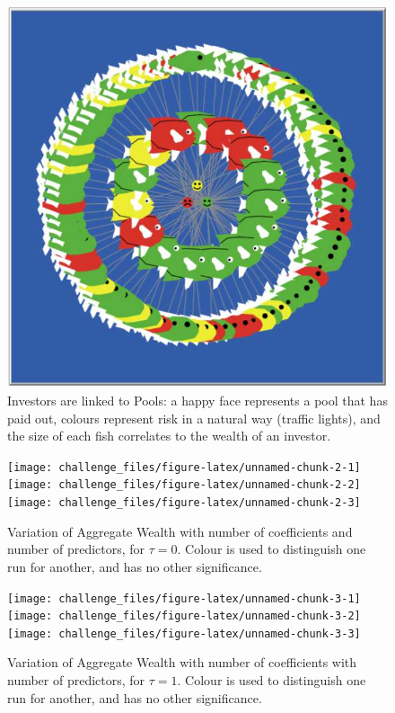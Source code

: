 \documentclass[]{article}
\begin{document}
\begin{figure}[p]

{\centering \includegraphics[width=.9\linewidth]{view} 

}

\caption{Investors are linked to Pools: a happy face represents a pool that has paid out, colours represent risk in a natural way (traffic lights), and the size of each fish correlates to the wealth of an investor.\label{fig:ui}}\label{fig:unnamed-chunk-1}
\end{figure}

\begin{figure}[p]

{\centering \texttt{[image: challenge\_files/figure-latex/unnamed-chunk-2-1]} \texttt{[image: challenge\_files/figure-latex/unnamed-chunk-2-2]} \texttt{[image: challenge\_files/figure-latex/unnamed-chunk-2-3]} 

}

\caption{\label{fig:plot_wealth0}Variation of Aggregate Wealth with number of coefficients and number of predictors, for $\tau=0$. Colour is used to distinguish one run for another, and has no other significance.}\label{fig:unnamed-chunk-2}
\end{figure}

\begin{figure}[p]

{\centering \texttt{[image: challenge\_files/figure-latex/unnamed-chunk-3-1]} \texttt{[image: challenge\_files/figure-latex/unnamed-chunk-3-2]} \texttt{[image: challenge\_files/figure-latex/unnamed-chunk-3-3]} 

}

\caption{\label{fig:plot_wealth1}Variation of Aggregate Wealth with number of coefficients with number of predictors, for $\tau=1$. Colour is used to distinguish one run for another, and has no other significance.}\label{fig:unnamed-chunk-3}
\end{figure}
\end{document}
